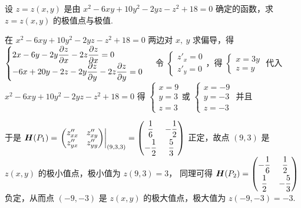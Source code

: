 \begin{example}[2004 数一]
    设 $z=z(x,y)$ 是由 $x^2-6xy+10y^2-2yz-z^2+18=0$ 确定的函数，求 $z=z(x,y)$ 的极值点与极值.
\end{example}
\begin{solution}
    在 $x^2-6xy+10y^2-2yz-z^2+18=0$ 两边对 $x,~y$ 求偏导，得 $\begin{cases}
        \displaystyle 2x-6y-2y\pdv{z}{x}-2z\pdv{z}{x}=0\\ 
        \displaystyle -6x+20y-2z-2y\pdv{z}{y}-2z\pdv{z}{y}=0
    \end{cases}$ 令 $\begin{cases}
        z'_x=0\\ z'_y=0
    \end{cases}$，得 $\begin{cases}
        x=3y\\ z=y 
    \end{cases}$ 代入 $x^2-6xy+10y^2-2yz-z^2+18=0$ 得 $\begin{cases}
        x=9\\ y=3 \\ z=3
    \end{cases}\text{或 } \begin{cases}
        x=-9\\ y=-3 \\ z=-3
    \end{cases}$ 并且 
    于是 $\vb*{H}(P_1)=\eval{\mqty(z''_{xx}&z''_{xy}\\z''_{yx}&z''_{yy})}_{(9,3,3)}=\mqty(\dfrac{1}{6}&-\dfrac{1}{2}\\[6pt]-\dfrac{1}{2}&\dfrac{5}{3})$ 正定，故点 $(9,3)$ 是 $z(x,y)$ 的极小值点，极小值为 $z(9,3)=3$，
    同理可得 $\vb*{H}(P_2)=\mqty(-\dfrac{1}{6}&\dfrac{1}{2}\\[6pt]\dfrac{1}{2}&-\dfrac{5}{3})$ 负定，从而点 $(-9,-3)$ 是 $z(x,y)$ 的极大值点，极大值为 $z(-9,-3)=-3.$
\end{solution}

